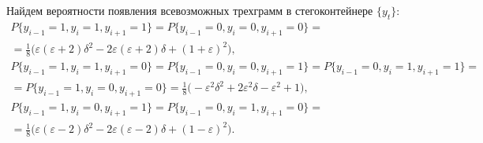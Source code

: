 \documentclass[a4paper,12pt]{article}
\theoremstyle{plain}
\begin{document}
	Найдем вероятности появления всевозможных трехграмм в стегоконтейнере $\{y_t\}$:
	\begin{gather*}
	P\{y_{i-1} = 1, y_i = 1, y_{i+1} = 1\} = P\{y_{i-1} = 0, y_i = 0, y_{i+1} = 0\}=\\=\tfrac{1}{8}\bigr(\varepsilon(\varepsilon+2)\delta^2 - 2\varepsilon(\varepsilon+2)\delta + (1+\varepsilon)^2 \bigr),\\
	P\{y_{i-1} = 1, y_i = 1, y_{i+1} = 0\} = P\{y_{i-1} = 0, y_i = 0, y_{i+1} = 1\}= P\{y_{i-1} = 0, y_i = 1, y_{i+1} = 1\} =\\= P\{y_{i-1} = 1, y_i = 0, y_{i+1} = 0\}   =\tfrac{1}{8}\bigr(-\varepsilon^2\delta^2 + 2\varepsilon^2\delta  -\varepsilon^2 + 1\bigr), \\
	P\{y_{i-1} = 1, y_i = 0, y_{i+1} = 1\} = P\{y_{i-1} = 0, y_i = 1, y_{i+1} = 0\}=\\=\tfrac{1}{8}\bigr(\varepsilon(\varepsilon-2)\delta^2 - 2\varepsilon(\varepsilon-2)\delta + (1-\varepsilon)^2 \bigr).
	\end{gather*}
	
\end{document}
